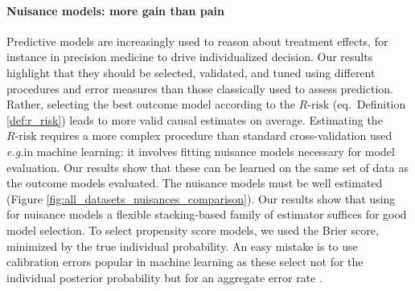 \documentclass[a4paper,num-refs]{oup-contemporary}%
\newcommand{\eg}{\emph{e.g.}}
\begin{document}
\paragraph{Nuisance models: more gain than pain}
%
Predictive models are increasingly used to reason about treatment effects, for
instance in precision medicine to drive individualized decision. Our results
highlight that they should be selected, validated, and tuned using different
procedures and error measures than those classically used to assess prediction. Rather, selecting the best outcome
model according to the $R\text{-risk}$ (eq.\, Definition \ref{def:r_risk}) leads
to more valid causal estimates on average. Estimating the $R\text{-risk}$ requires a more
complex procedure than standard cross-validation used \eg in machine
learning: it involves fitting nuisance models necessary for model
evaluation.
Our results show that these can be learned on the same set of data as the
outcome models evaluated. The nuisance models must be well estimated (Figure
\ref{fig:all_datasets_nuisances_comparison}). Our results show that using for
nuisance models a flexible stacking-based family of estimator suffices for good
model selection. To select propensity score models, we used the Brier score,
minimized by the true individual probability. An easy mistake is to
use calibration errors popular in machine learning
\cite{platt_probabilistic_1999,zadrozny_obtaining_2001,niculescu-mizil_predicting_2005,minderer_revisiting_2021}
as these select not for the individual posterior probability but for an
aggregate error rate \cite{perez2022beyond}.

%
\end{document}
